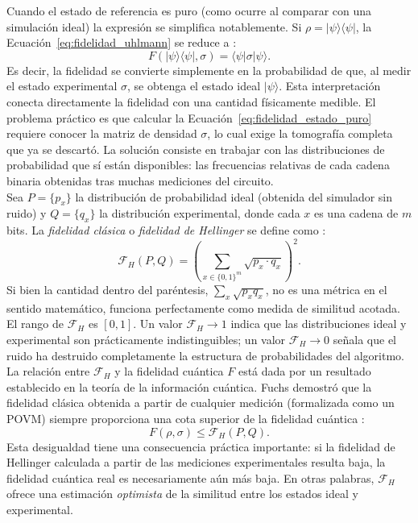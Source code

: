 \documentclass[12pt, spanish]{book}
\begin{document}
Cuando el estado de referencia es puro (como ocurre al comparar con una simulación ideal) la expresión se simplifica notablemente. Si $\rho = |\psi\rangle\langle\psi|$, la Ecuación~\ref{eq:fidelidad_uhlmann} se reduce a \cite{Fuchs1995, Nielsen2024}:
\begin{equation}
    F(|\psi\rangle\langle\psi|, \sigma) = \langle\psi|\sigma|\psi\rangle.
    \label{eq:fidelidad_estado_puro}
\end{equation}
Es decir, la fidelidad se convierte simplemente en la probabilidad de que, al medir el estado experimental $\sigma$, se obtenga el estado ideal $|\psi\rangle$. Esta interpretación conecta directamente la fidelidad con una cantidad físicamente medible. El problema práctico es que calcular la Ecuación~\ref{eq:fidelidad_estado_puro} requiere conocer la matriz de densidad $\sigma$, lo cual exige la tomografía completa que ya se descartó. La solución consiste en trabajar con las distribuciones de probabilidad que sí están disponibles: las frecuencias relativas de cada cadena binaria obtenidas tras muchas mediciones del circuito.\\

Sea $P = \{p_x\}$ la distribución de probabilidad ideal (obtenida del simulador sin ruido) y $Q = \{q_x\}$ la distribución experimental, donde cada $x$ es una cadena de $m$ bits. La \textit{fidelidad clásica} o \textit{fidelidad de Hellinger} se define como \cite{Nielsen2024, DeCusatis2021}:
\begin{equation}
    \mathcal{F}_H(P, Q) = \left( \sum_{x \in \{0,1\}^m} \sqrt{p_x \cdot q_x} \right)^2.
    \label{eq:fidelidad_clasica}
\end{equation}
Si bien la cantidad dentro del paréntesis, $\sum_x \sqrt{p_x q_x}$, no es una métrica en el sentido matemático, funciona perfectamente como medida de similitud acotada. El rango de $\mathcal{F}_H$ es $[0, 1]$. Un valor $\mathcal{F}_H \to 1$ indica que las distribuciones ideal y experimental son prácticamente indistinguibles; un valor $\mathcal{F}_H \to 0$ señala que el ruido ha destruido completamente la estructura de probabilidades del algoritmo.\\

La relación entre $\mathcal{F}_H$ y la fidelidad cuántica $F$ está dada por un resultado establecido en la teoría de la información cuántica. Fuchs demostró que la fidelidad clásica obtenida a partir de cualquier medición (formalizada como un POVM) siempre proporciona una cota superior de la fidelidad cuántica \cite{Fuchs1995, Wong2022}:
\begin{equation}
    F(\rho, \sigma) \leq \mathcal{F}_H(P, Q).
    \label{eq:fuchs_caves}
\end{equation}
Esta desigualdad tiene una consecuencia práctica importante: si la fidelidad de Hellinger calculada a partir de las mediciones experimentales resulta baja, la fidelidad cuántica real es necesariamente aún más baja. En otras palabras, $\mathcal{F}_H$ ofrece una estimación \textit{optimista} de la similitud entre los estados ideal y experimental.\\
\end{document}
